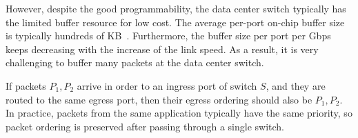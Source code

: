 However, despite the good programmability, the data center switch typically has the limited buffer resource for low cost.
The average per-port on-chip buffer size is typically hundreds of KB~\cite{bai2017congestion}.
Furthermore, the buffer size per port per Gbps keeps decreasing with the increase of the link speed.
As a result, it is very challenging to buffer many packets at the data center switch.

If packets $P_1, P_2$ arrive in order to an ingress port of switch $S$, and they are routed to the same egress port, then their egress ordering should also be $P_1, P_2$.
In practice, packets from the same application typically have the same priority, so packet ordering is preserved after passing through a single switch.
 





